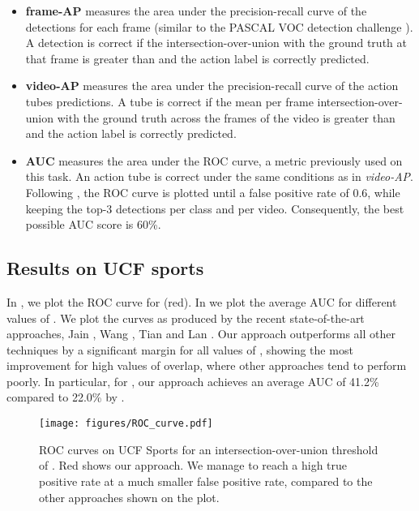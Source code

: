 \documentclass[10pt,twocolumn,letterpaper]{article}
\begin{document}
\begin{itemize}
\item{\bf{frame-AP}} measures the area under the precision-recall curve of the detections for each frame (similar to the PASCAL VOC detection challenge \cite{PASCAL-ijcv}). A detection is correct if the intersection-over-union with the ground truth at that frame is greater than  and the action label is correctly predicted.
\item{\bf{video-AP}} measures the area under the precision-recall curve of the action tubes predictions. A tube is correct if the mean per frame intersection-over-union with the ground truth across the frames of the video is greater than  and the action label is correctly predicted. 
\item{\bf{AUC}} measures the area under the ROC curve, a metric previously used on this task. An action tube is correct under the same conditions as in \textit{video-AP}. Following \cite{SDPM}, the ROC curve is plotted until a false positive rate of 0.6, while keeping the top-3 detections per class and per video. Consequently, the best possible AUC score is 60\%. 
\end{itemize}

\subsection{Results on UCF sports}

In , we plot the ROC curve for  (red). In  we plot the average AUC for different values of . We plot the curves as produced by the recent state-of-the-art approaches, Jain \etal \cite{Jain2014}, Wang \etal \cite{WangQT14}, Tian \etal \cite{SDPM} and Lan \etal \cite{LanWM11}. Our approach outperforms all other techniques by a significant margin for all values of , showing the most improvement for high values of overlap, where other approaches tend to perform poorly. In particular, for , our approach achieves an average AUC of 41.2\% compared to 22.0\% by \cite{WangQT14}. 

\begin{figure}[t]
\begin{center}
  \texttt{[image: figures/ROC\_curve.pdf]}
\end{center}
   \caption{ROC curves on UCF Sports for an intersection-over-union threshold of . Red shows our approach. We manage to reach a high true positive rate at a much smaller false positive rate, compared to the other approaches shown on the plot.}
\end{figure}
\end{document}
